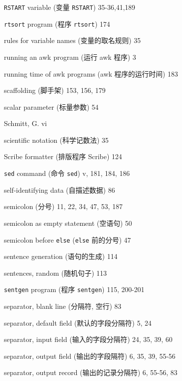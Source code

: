 \begin{multicols}{2}
\hangindent=2pc  \verb'RSTART' variable (变量 \verb'RSTART')
35-36,41,189

\hangindent=2pc  \verb'rtsort' program (程序 \verb'rtsort') 174

\hangindent=2pc  rules for variable names (变量的取名规则) 35

\hangindent=2pc  running an awk program (运行 awk 程序) 3

\hangindent=2pc  running time of awk programs (awk
程序的运行时间) 183

\hangindent=2pc  scaffolding (脚手架) 153, 156, 179

\hangindent=2pc  scalar parameter (标量参数) 54

\hangindent=2pc  Schmitt, G. vi

\hangindent=2pc  scientific notation (科学记数法) 35

\hangindent=2pc  Scribe formatter (排版程序 Scribe) 124

\hangindent=2pc  \verb'sed' command (命令 \verb'sed')
v, 181, 184, 186

\hangindent=2pc  self-identifying data (自描述数据) 86

\hangindent=2pc  semicolon (分号) 11, 22, 34, 47, 53, 187

\hangindent=2pc  semicolon as empty statement (空语句) 50

\hangindent=2pc  semicolon before \verb'else' (\verb'else'
前的分号) 47

\hangindent=2pc  sentence generation (语句的生成) 114

\hangindent=2pc  sentences, random (随机句子) 113

\hangindent=2pc  \verb'sentgen' program (程序 \verb'sentgen')
115, 200-201

\hangindent=2pc  separator, blank line (分隔符, 空行) 83

\hangindent=2pc  separator, default field (默认的字段分隔符) 5, 24

\hangindent=2pc  separator, input field (输入的字段分隔符)
24, 35, 39, 60

\hangindent=2pc  separator, output field (输出的字段隔符)
6, 35, 39, 55-56

\hangindent=2pc  separator, output record (输出的记录分隔符)
6, 55-56,  83


\end{multicols}
